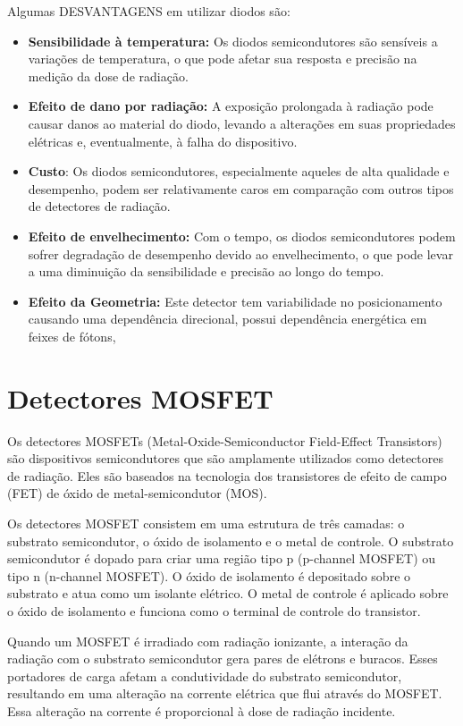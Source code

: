 \documentclass[11pt,a4paper]{article}
\begin{document}
			Algumas \textcolor{CarnationPink}{DESVANTAGENS} em utilizar diodos são:

			\begin{itemize}[label=\textcolor{CarnationPink}{$\blacktriangleright$}]
				\item \textbf{Sensibilidade à temperatura:} Os diodos semicondutores são sensíveis a variações de temperatura, o que pode afetar sua resposta e precisão na medição da dose de radiação.
				\item \textbf{Efeito de dano por radiação:} A exposição prolongada à radiação pode causar danos ao material do diodo, levando a alterações em suas propriedades elétricas e, eventualmente, à falha do dispositivo.
				\item \textbf{Custo}: Os diodos semicondutores, especialmente aqueles de alta qualidade e desempenho, podem ser relativamente caros em comparação com outros tipos de detectores de radiação.
				\item \textbf{Efeito de envelhecimento:} Com o tempo, os diodos semicondutores podem sofrer degradação de desempenho devido ao envelhecimento, o que pode levar a uma diminuição da sensibilidade e precisão ao longo do tempo.
				\item \textbf{Efeito da Geometria:} Este detector tem variabilidade no posicionamento causando uma dependência direcional, possui dependência energética em feixes de fótons,
			\end{itemize}
		
	\section{Detectores MOSFET}

		Os detectores MOSFETs (Metal-Oxide-Semiconductor Field-Effect Transistors) são dispositivos semicondutores que são amplamente utilizados como detectores de radiação. Eles são baseados na tecnologia dos transistores de efeito de campo (FET) de óxido de metal-semicondutor (MOS).

		Os detectores MOSFET consistem em uma estrutura de três camadas: o substrato semicondutor, o óxido de isolamento e o metal de controle. O substrato semicondutor é dopado para criar uma região tipo p (p-channel MOSFET) ou tipo n (n-channel MOSFET). O óxido de isolamento é depositado sobre o substrato e atua como um isolante elétrico. O metal de controle é aplicado sobre o óxido de isolamento e funciona como o terminal de controle do transistor.
	
		Quando um MOSFET é irradiado com radiação ionizante, a interação da radiação com o substrato semicondutor gera pares de elétrons e buracos. Esses portadores de carga afetam a condutividade do substrato semicondutor, resultando em uma alteração na corrente elétrica que flui através do MOSFET. Essa alteração na corrente é proporcional à dose de radiação incidente.
	
\end{document}
